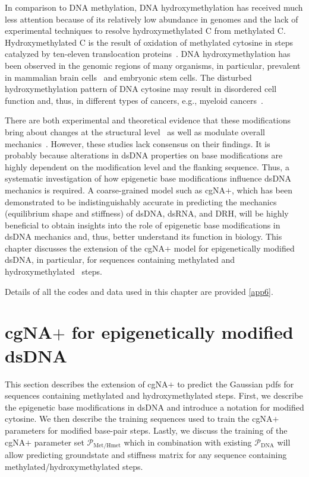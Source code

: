 In comparison to DNA methylation, DNA hydroxymethylation has received much less attention because of its relatively low abundance in genomes and the lack of experimental techniques to resolve hydroxymethylated C from methylated C.
Hydroxymethylated C is the result of oxidation of methylated cytosine in \cpg steps catalyzed by ten-eleven translocation proteins~\cite{tahiliani2009conversion}. 
DNA hydroxymethylation has been observed in the genomic regions of many organisms, in particular, prevalent in mammalian brain cells~\cite{munzel2010quantification} and embryonic stem cells.
The disturbed hydroxymethylation pattern of DNA cytosine may result in disordered cell function and, thus, in different types of cancers, e.g., myeloid cancers~\cite{ko2010impaired}.

There are both experimental and theoretical evidence that these modifications bring about changes at the structural
level~\cite{b1favour,battistini2021impact,lefebvre1996solution,rao2018systematic,carvalho2014understanding} as well as modulate overall mechanics~\cite{severin2011cytosine,ngo2016effects,geahigan2000dynamic,jimenez2014unmethylated,carvalho2014understanding,severin2013effects}.
However, these studies lack consensus on their findings. 
It is probably because alterations in dsDNA properties on base modifications are highly dependent on the modification level and the flanking sequence.
Thus, a systematic investigation of how epigenetic base modifications influence dsDNA mechanics is required. 
A coarse-grained model such as cgNA$+$, which has been demonstrated to be indistinguishably accurate in predicting the mechanics (equilibrium shape and stiffness) of dsDNA, dsRNA, and DRH, will be highly beneficial to obtain insights into the role of epigenetic base modifications in dsDNA mechanics and, thus, better understand its function in biology.
This chapter discusses the extension of the cgNA$+$ model for epigenetically modified dsDNA, in particular, for sequences containing methylated and hydroxymethylated \cpg \ steps.

Details of all the codes and data used in this chapter are provided \cref{app6}. 

\section{cgNA$+$ for epigenetically modified dsDNA}
This section describes the extension of cgNA$+$ to predict the Gaussian pdfs for sequences containing methylated and hydroxymethylated \cpg steps.
First, we describe the epigenetic base modifications in dsDNA and introduce a notation for modified cytosine. 
We then describe the training sequences used to train the cgNA$+$ parameters for modified base-pair steps. Lastly, we discuss the training of the cgNA$+$ parameter set $\mathcal{P}_{\text{Met/Hmet}}$ which in combination with existing $\mathcal{P}_{\text{DNA}}$ will allow predicting groundstate and stiffness matrix for any sequence containing methylated/hydroxymethylated \cpg steps. 

